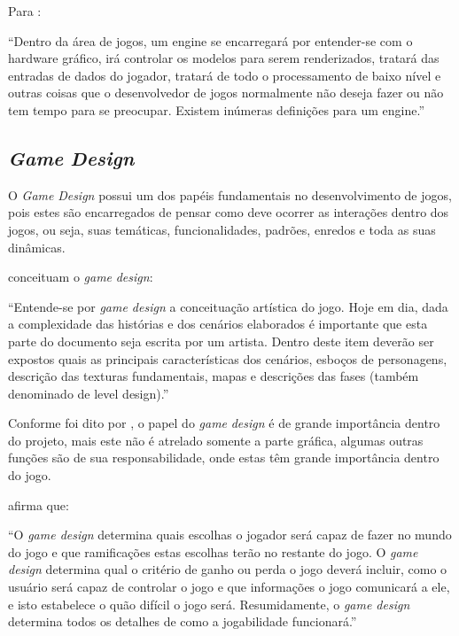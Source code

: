\documentclass[
	12pt,				%
    oneside,			%
	a4paper,			%
	english,			%
	french,				%
	spanish,			%
	brazil,				%
	]{abntex2}
\begin{document}
		Para :
		\begin{citacao}
			“Dentro da área de jogos, um engine se encarregará por entender-se com o hardware gráfico, irá controlar os modelos para serem renderizados, tratará das entradas de dados do jogador, tratará de todo o processamento de baixo nível e outras coisas que o desenvolvedor de jogos normalmente não deseja fazer ou não tem tempo para se preocupar. Existem inúmeras definições para um engine.”
		\end{citacao}
	
	\subsection{\textit{Game} \textit{Design}}
		
		O \textit{Game} \textit{Design} possui um dos papéis fundamentais no desenvolvimento de jogos, pois estes são encarregados de pensar como deve ocorrer as interações dentro dos jogos, ou seja, suas temáticas, funcionalidades, padrões, enredos e toda as suas dinâmicas.
		
		 conceituam o \textit{game} \textit{design}:
		\begin{citacao}
			“Entende-se por \textit{game design} a conceituação artística do jogo. Hoje em dia, dada a complexidade das histórias e dos cenários elaborados é importante que esta parte do documento seja escrita por um artista. Dentro deste item deverão ser expostos quais as principais características dos cenários, esboços de personagens, descrição das texturas fundamentais, mapas e descrições das fases (também denominado de level design).”
		\end{citacao}
		
		Conforme foi dito por , o papel do \textit{game} \textit{design} é de grande importância dentro do projeto, mais este não é atrelado somente a parte gráfica, algumas outras funções são de sua responsabilidade, onde estas têm grande importância dentro do jogo.
		
		 afirma que:
		\begin{citacao}
			“O \textit{game design} determina quais escolhas o jogador será capaz de fazer no mundo do jogo e que ramificações estas escolhas terão no restante do jogo. O \textit{game design} determina qual o critério de ganho ou perda o jogo deverá incluir, como o usuário será capaz de controlar o jogo e que informações o jogo comunicará a ele, e isto estabelece o quão difícil o jogo será. Resumidamente, o \textit{game design} determina todos os detalhes de como a jogabilidade funcionará.”
			
		\end{citacao}
\end{document}
